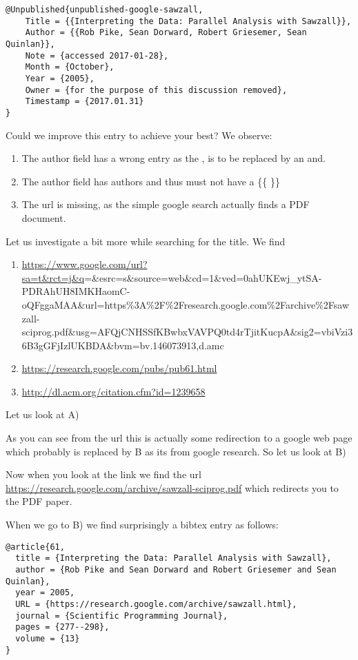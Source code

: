 \begin{verbatim}
@Unpublished{unpublished-google-sawzall,
    Title = {{Interpreting the Data: Parallel Analysis with Sawzall}},
    Author = {{Rob Pike, Sean Dorward, Robert Griesemer, Sean Quinlan}},
    Note = {accessed 2017-01-28},
    Month = {October},
    Year = {2005},
    Owner = {for the purpose of this discussion removed},
    Timestamp = {2017.01.31}
}
\end{verbatim}

Could we improve this entry to achieve your best? We observe:

\begin{enumerate}
\item
  The author field has a wrong entry as the , is to be replaced by an
  and.
\item
  The author field has authors and thus must not have a \{\{ \}\}
\item
  The url is missing, as the simple google search actually finds a PDF
  document.
\end{enumerate}

Let us investigate a bit more while searching for the title. We find

\begin{enumerate}
\def\labelenumi{\Alph{enumi})}
\item
  \url{https://www.google.com/url?sa=t\&rct=j\&q}=\&esrc=s\&source=web\&cd=1\&ved=0ahUKEwj\_ytSA-PDRAhUH8IMKHaomC-oQFggaMAA\&url=https\%3A\%2F\%2Fresearch.google.com\%2Farchive\%2Fsawzall-sciprog.pdf\&usg=AFQjCNHSSfKBwbxVAVPQ0td4rTjitKucpA\&sig2=vbiVzi36B3gGFjIzlUKBDA\&bvm=bv.146073913,d.amc
\item
  \url{https://research.google.com/pubs/pub61.html}
\item
  \url{http://dl.acm.org/citation.cfm?id=1239658}
\end{enumerate}

Let us look at A)

As you can see from the url this is actually some redirection to a google
web page which probably is replaced by B as its from google research. So
let us look at B)

Now when you look at the link we find the url
\url{https://research.google.com/archive/sawzall-sciprog.pdf} which
redirects you to the PDF paper.

When we go to B) we find surprisingly a bibtex entry as follows:

\begin{verbatim}
@article{61,
  title = {Interpreting the Data: Parallel Analysis with Sawzall},
  author = {Rob Pike and Sean Dorward and Robert Griesemer and Sean Quinlan},
  year = 2005,
  URL = {https://research.google.com/archive/sawzall.html},
  journal = {Scientific Programming Journal},
  pages = {277--298},
  volume = {13}
}
\end{verbatim}

